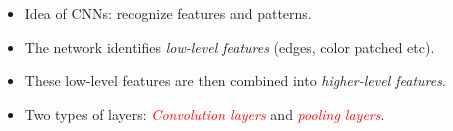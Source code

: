 \documentclass[
  10pt,
  ignorenonframetext,
]{beamer}
\providecommand{\tightlist}{%
  \setlength{\itemsep}{0pt}\setlength{\parskip}{0pt}}
\begin{document}
\begin{frame}
\vspace{2mm}

\begin{itemize}
\tightlist
\item
  Idea of CNNs: recognize features and patterns.
\end{itemize}

\vspace{2mm}

\begin{itemize}
\tightlist
\item
  The network identifies \emph{low-level features} (edges, color patched
  etc).
\end{itemize}

\vspace{2mm}

\begin{itemize}
\tightlist
\item
  These low-level features are then combined into \emph{higher-level
  features}.
\end{itemize}

\vspace{2mm}

\begin{itemize}
\tightlist
\item
  Two types of layers: \emph{\textcolor{red}{Convolution layers}} and
  \emph{\textcolor{red}{pooling layers}}.
\end{itemize}
\end{frame}
\end{document}
